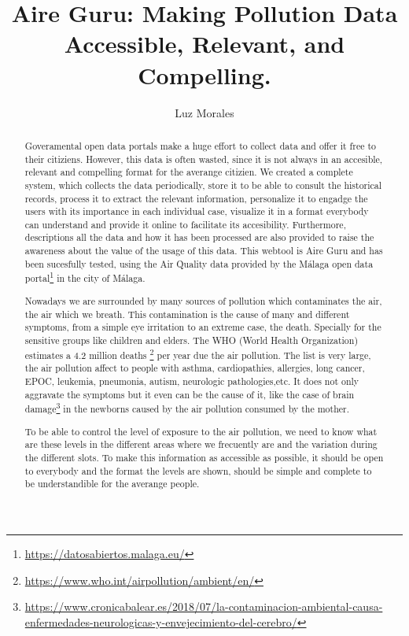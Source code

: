 \documentclass[final,2p,times]{elsarticle}
\begin{document}
\begin{frontmatter}

\title{Aire Guru: Making Pollution Data Accessible, Relevant, and Compelling.}

\author{Luz Morales}
\address{Universidad Internacional de La Rioja}

\begin{abstract}
Goveramental open data portals make a huge effort to collect data and offer it free to their citiziens.
However, this data is often wasted, since it is not always in an accesible, relevant and compelling format
for the averange citizien.
We created a complete system, which collects the data periodically, store it to be able to consult the historical records,
process it to extract the relevant information, personalize it to engadge the users with its importance in each individual
case, visualize it in a format everybody can understand and provide it online to facilitate its accesibility. Furthermore,
descriptions all the data and how it has been processed are also provided to raise the awareness about the value
of the usage of this data. This webtool is Aire Guru and has been sucesfully tested, using the Air Quality data provided
by the Málaga open data portal\footnote{\url{https://datosabiertos.malaga.eu/}} in the city of Málaga.


Nowadays we are surrounded by many sources of pollution which contaminates the air, the air 
which we breath. This contamination is the cause of many and different symptoms, from a simple eye irritation 
to an extreme case, the death. Specially for the sensitive groups like children and elders.
The WHO (World Health Organization) estimates a 4.2 million deaths
\footnote{\url{https://www.who.int/airpollution/ambient/en/}} per year due the air pollution.
The list is very large, the air pollution affect to people with asthma, cardiopathies, allergies,
long cancer, EPOC, leukemia, pneumonia, autism, neurologic pathologies,etc.
It does not only aggravate the symptoms but it even can be the cause of it, like the case of brain
damage\footnote{\url{https://www.cronicabalear.es/2018/07/la-contaminacion-ambiental-causa-
enfermedades-neurologicas-y-envejecimiento-del-cerebro/}} 
in the newborns caused by the air pollution consumed by the mother.

To be able to control the level of exposure to the air pollution, we need to know what are these levels
in the different areas where we frecuently are and the variation during the different slots.
To make this information as accessible as possible, it should be open to everybody and the format the levels
are shown, should be simple and complete to be understandible for the averange people.


\end{abstract}
\end{frontmatter}
\end{document}
